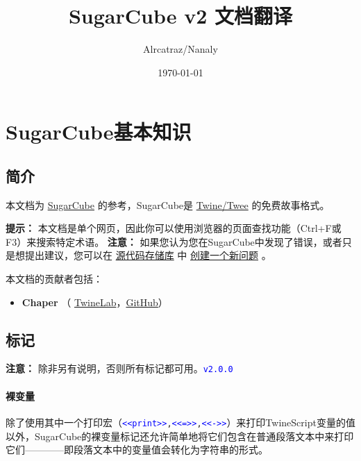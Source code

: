 \documentclass[hyperref,UTF8]{ctexart}
\title{SugarCube v2 文档翻译}
\author{Alrcatraz/Nanaly}
\date{\today}
\begin{document}
\maketitle
\newpage
\tableofcontents

\newpage
\section{SugarCube基本知识}
\subsection{简介}
本文档为 \href{http://www.motoslave.net/sugarcube/}{SugarCube} 的参考，SugarCube是 \href{http://twinery.org/}{Twine/Twee} 的免费故事格式。

\textbf{提示：} 本文档是单个网页，因此你可以使用浏览器的页面查找功能（Ctrl+F或F3）来搜索特定术语。
\textbf{注意：} 如果您认为您在SugarCube中发现了错误，或者只是想提出建议，您可以在 \href{https://github.com/tmedwards/sugarcube-2}{源代码存储库} 中 \href{https://github.com/tmedwards/sugarcube-2/issues}{创建一个新问题} 。

本文档的贡献者包括：
\begin{itemize}
    \item \textbf{Chaper} （ \href{https://twinelab.net/}{TwineLab}，\href{https://github.com/ChapelR/}{GitHub}）
\end{itemize}

\subsection{标记}
\textbf{注意：} 除非另有说明，否则所有标记都可用。\texttt{\textcolor{blue}{v2.0.0}}
\paragraph{裸变量}

除了使用其中一个打印宏（\texttt{\textcolor{blue}{<<print>>},\textcolor{blue}{<<=>>},\textcolor{blue}{<<->>}}）来打印TwineScript变量的值以外，SugarCube的裸变量标记还允许简单地将它们包含在普通段落文本中来打印它们————即段落文本中的变量值会转化为字符串的形式。
\end{document}
